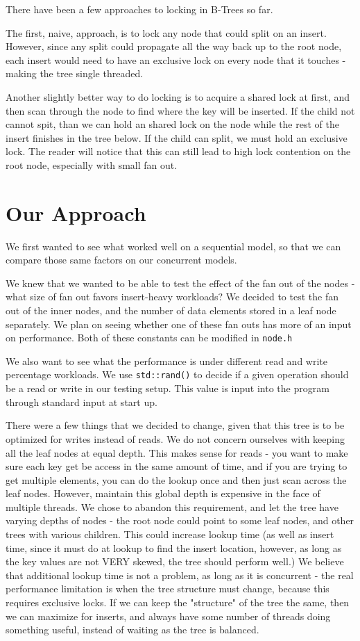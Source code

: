 \documentclass{sig-alternate}
\begin{document}
There have been a few approaches to locking in B-Trees so far.

The first, naive, approach, is to lock any node that could split on an insert.  However, since any split could propagate all the way back up to the root node, each insert would need to have an exclusive lock on every node that it touches - making the tree single threaded.

Another slightly better way to do locking is to acquire a shared lock at first, and then scan through the node to find where the key will be inserted.  If the child not cannot spit, than we can hold an shared lock on the node while the rest of the insert finishes in the tree below.  If the child can split, we must hold an exclusive lock.  The reader will notice that this can still lead to high lock contention on the root node, especially with small fan out.

\section{Our Approach}
We first wanted to see what worked well on a sequential model, so that we can compare those same factors on our concurrent models.

We knew that we wanted to be able to test the effect of the fan out of the nodes - what size of fan out favors insert-heavy workloads? We decided to test the fan out of the inner nodes, and the number of data elements stored in a leaf node separately.  We plan on seeing whether one of these fan outs has more of an input on performance.  Both of these constants can be modified in \texttt{node.h}

We also want to see what the performance is under different read and write percentage workloads.  We use \texttt{std::rand()} to decide if a given operation should be a read or write in our testing setup.  This value is input into the program through standard input at start up.

There were a few things that we decided to change, given that this tree is to be optimized for writes instead of reads.  
We do not concern ourselves with keeping all the leaf nodes at equal depth.  This makes sense for reads - you want to make sure each key get be access in the same amount of time, and if you are trying to get multiple elements, you can do the lookup once and then just scan across the leaf nodes.  However, maintain this global depth is expensive in the face of multiple threads.  We chose to abandon this requirement, and let the tree have varying depths of nodes - the root node could point to some leaf nodes, and other trees with various children.  This could increase lookup time (as well as insert time, since it must do at lookup to find the insert location, however, as long as the key values are not VERY skewed, the tree should perform well.)  We believe that additional lookup time is not a problem, as long as it is concurrent - the real performance limitation is when the tree structure must change, because this requires exclusive locks.  If we can keep the "structure" of the tree the same, then we can maximize for inserts, and always have some number of threads doing something useful, instead of waiting as the tree is balanced.
\end{document}
